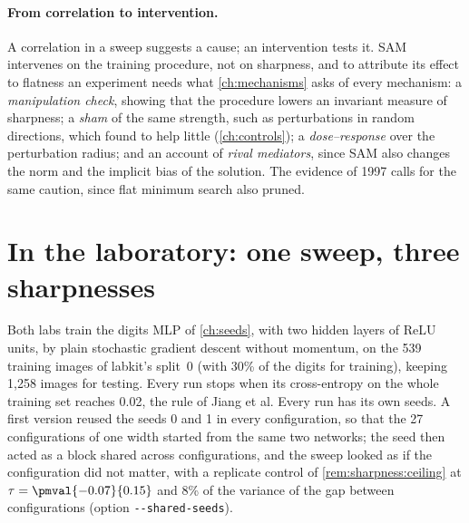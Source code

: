 \begin{refsection}
\paragraph{From correlation to intervention.} A correlation in a sweep suggests a cause; an intervention tests it. SAM intervenes on the training procedure, not on sharpness, and to attribute its effect to flatness an experiment needs what \cref{ch:mechanisms} asks of every mechanism: a \emph{manipulation check}, showing that the procedure lowers an invariant measure of sharpness; a \emph{sham} of the same strength, such as perturbations in random directions, which \textcite{AndriushchenkoFlammarion2022} found to help little (\cref{ch:controls}); a \emph{dose--response} over the perturbation radius; and an account of \emph{rival mediators}, since SAM also changes the norm and the implicit bias of the solution. The evidence of 1997 calls for the same caution, since flat minimum search also pruned.

\section{In the laboratory: one sweep, three sharpnesses}\label{sec:sharpness:lab}

Both labs train the digits MLP of \cref{ch:seeds}, with two hidden layers of ReLU units, by plain stochastic gradient descent without momentum, on the 539 training images of labkit's split~0 (with 30\% of the digits for training), keeping 1,258 images for testing. Every run stops when its cross-entropy on the whole training set reaches 0.02, the rule of Jiang et al. Every run has its own seeds. A first version reused the seeds 0 and 1 in every configuration, so that the 27 configurations of one width started from the same two networks; the seed then acted as a block shared across configurations, and the sweep looked as if the configuration did not matter, with a replicate control of \cref{rem:sharpness:ceiling} at $\tau=\pmval{-0.07}{0.15}$ and 8\% of the variance of the gap between configurations (option \texttt{-{}-shared-seeds}).


\end{refsection}
